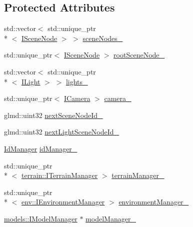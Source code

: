 \subsection*{Protected Attributes}
\begin{DoxyCompactItemize}
\item 
std\-::vector$<$ std\-::unique\-\_\-ptr\\*
$<$ \hyperlink{classglr_1_1ISceneNode}{I\-Scene\-Node} $>$ $>$ \hyperlink{classglr_1_1BasicSceneManager_a3d319cb54555b138f02be327d9184054}{scene\-Nodes\-\_\-}
\item 
std\-::unique\-\_\-ptr$<$ \hyperlink{classglr_1_1ISceneNode}{I\-Scene\-Node} $>$ \hyperlink{classglr_1_1BasicSceneManager_affbd5e5af862011f985d32ddcac10165}{root\-Scene\-Node\-\_\-}
\item 
std\-::vector$<$ std\-::unique\-\_\-ptr\\*
$<$ \hyperlink{classglr_1_1ILight}{I\-Light} $>$ $>$ \hyperlink{classglr_1_1BasicSceneManager_af8320803ed756bf7a66c258d506cb4f9}{lights\-\_\-}
\item 
std\-::unique\-\_\-ptr$<$ \hyperlink{classglr_1_1ICamera}{I\-Camera} $>$ \hyperlink{classglr_1_1BasicSceneManager_ad24ef42e9aedb62920fbf0ed28451e33}{camera\-\_\-}
\item 
glmd\-::uint32 \hyperlink{classglr_1_1BasicSceneManager_a6c6322dedcc742c5a61e6009510a1bbf}{next\-Scene\-Node\-Id\-\_\-}
\item 
glmd\-::uint32 \hyperlink{classglr_1_1BasicSceneManager_a72d2740d1ef0d7530dac176ef61601ea}{next\-Light\-Scene\-Node\-Id\-\_\-}
\item 
\hyperlink{classglr_1_1IdManager}{Id\-Manager} \hyperlink{classglr_1_1BasicSceneManager_a99b719d967c128d23bc30f035f7cef42}{id\-Manager\-\_\-}
\item 
std\-::unique\-\_\-ptr\\*
$<$ \hyperlink{classglr_1_1terrain_1_1ITerrainManager}{terrain\-::\-I\-Terrain\-Manager} $>$ \hyperlink{classglr_1_1BasicSceneManager_afd1b9259e9ddad070f593ea3ad41b7c1}{terrain\-Manager\-\_\-}
\item 
std\-::unique\-\_\-ptr\\*
$<$ \hyperlink{classglr_1_1env_1_1IEnvironmentManager}{env\-::\-I\-Environment\-Manager} $>$ \hyperlink{classglr_1_1BasicSceneManager_a1243597aaa2e93a40265338bbd2b9817}{environment\-Manager\-\_\-}
\item 
\hyperlink{classglr_1_1models_1_1IModelManager}{models\-::\-I\-Model\-Manager} $\ast$ \hyperlink{classglr_1_1BasicSceneManager_a5ba71afac8a9e6c937a1419b4aa723a5}{model\-Manager\-\_\-}

\end{DoxyCompactItemize}
